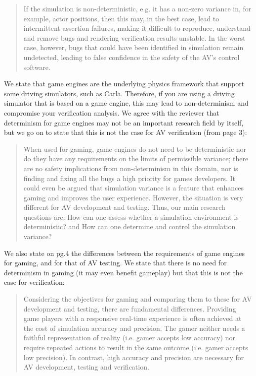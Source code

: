 \documentclass[11pt, a4paper]{letter} %
\begin{document}
\begin{letter}
\begin{quote}
If the simulation is non-deterministic, e.g. it has a non-zero variance in, for example, actor positions, then this may, in the best case, lead to intermittent assertion failures, making it difficult to reproduce, understand and remove bugs and rendering verification results unstable. In the worst case, however, bugs that could have been identified in simulation remain undetected, leading to false confidence in the safety of the AV’s control software.
\end{quote}

We state that game engines are the underlying physics framework that support some driving simulators, such as Carla. Therefore, if you are using a driving simulator that is based on a game engine, this may lead to non-determinism and compromise your verification analysis. We agree with the reviewer that determinism for game engines may not be an important research field by itself, but we go on to state that this is not the case for AV verification (from page 3):  

\begin{quote}
When used for gaming, game engines do not need to be deterministic nor do they have any requirements on the limits of permissible variance; there are no safety implications from non-determinism in this domain, nor is finding and fixing all the bugs a high priority for games developers. It could even be argued that simulation variance is a feature that enhances gaming and improves the user experience. However, the situation is very different for AV development and testing. Thus, our main research questions are: How can one assess whether a simulation environment is deterministic? and How can one determine and control the simulation variance? 
\end{quote}

We also state on pg.4 the differences between the requirements of game engines for gaming, and for that of AV testing. We state that there is no need for determinism in gaming (it may even benefit gameplay) but that this is not the case for verification: 

\begin{quote}
Considering the objectives for gaming and comparing them to these for AV development and testing, there are fundamental differences. Providing game players with a responsive real-time experience is often achieved at the cost of simulation accuracy and precision. The gamer neither needs a faithful representation of reality (i.e. gamer accepts low accuracy) nor require repeated actions to result in the same outcome (i.e. gamer accepts low precision). In contrast, high accuracy and precision are necessary for AV development, testing and verification.
\end{quote}


\end{letter}
\end{document}
